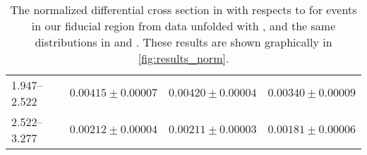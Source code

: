 \begin{table}
\begin{center}
\begin{tabular}{@{}l r r r@{}}
            1.947--2.522  &  $0.00415  \pm  0.00007$  &  $0.00420  \pm  0.00004$  &  $0.00340  \pm  0.00009$  \\
            2.522--3.277  &  $0.00212  \pm  0.00004$  &  $0.00211  \pm  0.00003$  &  $0.00181  \pm  0.00006$  \\
            \bottomrule
        \end{tabular}
    \end{center}
    \caption[
        The normalized differential cross section in \pb with respects to
        \phistar for \Ztoee events in our fiducial region from data unfolded
        with \MADGRAPH.
    ]{
        The normalized differential cross section in \pb with respects to
        \phistar for \Ztoee events in our fiducial region from data unfolded
        with \MADGRAPH, and the same distributions in \MADGRAPH and \POWHEG.
        These results are shown graphically in \cref{fig:results_norm}.
    }
    \label{tab:results_norm}
\end{table}
